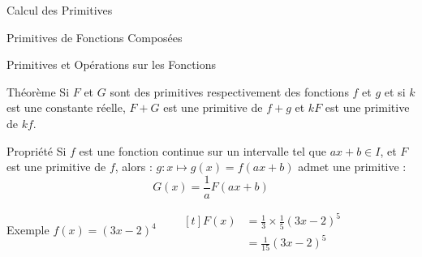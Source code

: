 \documentclass{coursbook}
\begin{document}
\begin{Gpartie}{Calcul des Primitives}
\begin{Spartie}{Primitives de Fonctions Composées}
\begin{table}[H]
            \end{table}
        \end{Spartie}
        \pagebreak
        \begin{Spartie}{Primitives et Opérations sur les Fonctions} 
            \begin{SSpartie}{Théorème} 
                Si $F$ et $G$ sont des primitives respectivement des fonctions $f$ et $g$ et si $k$ est une constante réelle, $F+G$ est une primitive de $f+g$ et $kF$ est une primitive de $kf$.
            \end{SSpartie}
            \begin{SSpartie}{Propriété} 
                Si $f$ est une fonction continue sur un intervalle tel que $ax+b\in I$, et $F$ est une primitive de $f$, alors : $g:x\mapsto g(x)=f(ax+b)$ admet une primitive :
                \[G(x)=\frac{1}{a}F(ax+b)\]
                \begin{SSSpartie}{Exemple} 
                    $f(x)=(3x-2)^4\qquad
                    \begin{aligned}[t]
                        F(x)&=\tfrac{1}{3}\times\tfrac{1}{5}(3x-2)^5 \\
                        &=\tfrac{1}{15}(3x-2)^5
                    \end{aligned}$
                \end{SSSpartie}
            \end{SSpartie}
        \end{Spartie}
    \end{Gpartie}
\end{document}
